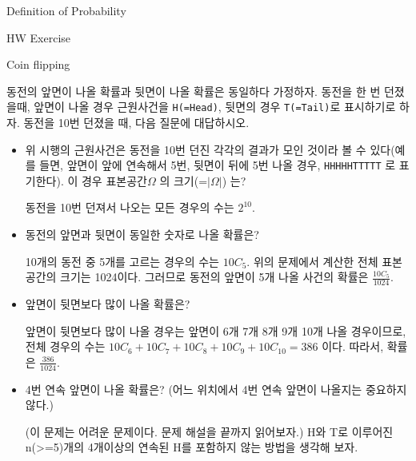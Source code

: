 \begin{edXchapter}{Definition of Probability}

\begin{edXsection}{HW Exercise}

\begin{edXvertical}

\begin{edXproblem}{Coin flipping}

동전의 앞면이 나올 확률과 뒷면이 나올 확률은 동일하다 가정하자. 동전을 한 번 던졌을때,
앞면이 나올 경우 근원사건을 {\tt H(=Head)}, 뒷면의 경우 {\tt T(=Tail)}로 표시하기로 하자.
동전을 10번 던졌을 때, 다음 질문에 대답하시오.


\begin{itemize}
\item 위 시행의 근원사건은 동전을 10번 던진 각각의  결과가 모인 것이라 볼 수 있다(예를 들면, 앞면이 앞에 연속해서 5번, 뒷면이 뒤에 5번 나올 경우, {\tt HHHHHTTTTT} 로 표기한다).  
이 경우 표본공간$\Omega$ 의 크기(=$|\Omega|$) 는?
\begin{edXsolution}
동전을 10번 던져서 나오는 모든 경우의 수는 $2^{10}$.
\end{edXsolution}
\item 동전의 앞면과 뒷면이 동일한 숫자로 나올 확률은?
\begin{edXsolution}
10개의 동전 중 5개를 고르는 경우의 수는 $10C_5$.
위의 문제에서 계산한 전체 표본공간의 크기는 1024이다. 그러므로 동전의 앞면이 5개 나올 사건의 확률은 $\frac{10C_5}{1024}$.
\end{edXsolution}
\item 앞면이 뒷면보다 많이 나올 확률은?
\begin{edXsolution}
앞면이 뒷면보다 많이 나올 경우는 앞면이 6개 7개 8개 9개 10개 나올 경우이므로, 
전체 경우의 수는 $10C_6 + 10C_7 + 10C_8 + 10C_9 + 10C_10 = 386 $ 이다.
따라서, 확률은 $\frac{386}{1024}$.
\end{edXsolution}
\item 4번 연속 앞면이 나올 확률은? (어느 위치에서 4번 연속 앞면이 나올지는 중요하지 않다.) 
\begin{edXsolution}
(이 문제는 어려운 문제이다. 문제 해설을 끝까지 읽어보자.) H와 T로 이루어진 n(>=5)개의 4개이상의 연속된 H를 포함하지 않는 방법을 생각해 보자.

\end{edXsolution}
\end{itemize}
\end{edXproblem}
\end{edXvertical}
\end{edXsection}
\end{edXchapter}
